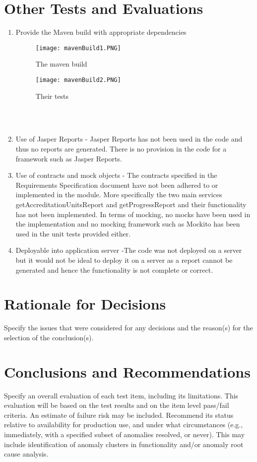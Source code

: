 \section{Other Tests and Evaluations}
 
\begin{enumerate}    
\item Provide the Maven build with appropriate dependencies
\begin{figure}[h!]
  \caption{The maven build}
	\texttt{[image: mavenBuild1.PNG]}
\end{figure} 
\begin{figure}[h!]
  \caption{Their tests}
	\texttt{[image: mavenBuild2.PNG]}
\end{figure} \\ \\
\item Use of Jasper Reports - Jasper Reports has not been used in the code and thus no reports are generated. There is no provision in the code for a framework such as Jasper Reports. 
\item Use of contracts and mock objects - The contracts specified in the Requirements Specification document have not been adhered to or implemented in the module. More specifically the two main services getAccreditationUnitsReport and getProgressReport and their functionality has not been implemented. In terms of mocking, no mocks have been used in the implementation and no mocking framework such as Mockito has been used in the unit tests provided either.
\item Deployable into application server -The code was not deployed on a server but it would not be ideal to deploy it on a server as a report cannot be generated and hence the functionality is not complete or correct.  
\end{enumerate}

\section{Rationale for Decisions}
Specify the issues that were considered for any decisions and the reason(s) for the selection of the
conclusion(s).

\section{Conclusions and Recommendations}
\label{sec:conclusions}
Specify an overall evaluation of each test item, including its limitations. This evaluation will be based
on the test results and on the item level pass/fail criteria. An estimate of failure risk may be included.
Recommend its status relative to availability for production use, and under what circumstances (e.g.,
immediately, with a specified subset of anomalies resolved, or never). This may include identification
of anomaly clusters in functionality and/or anomaly root cause analysis.
